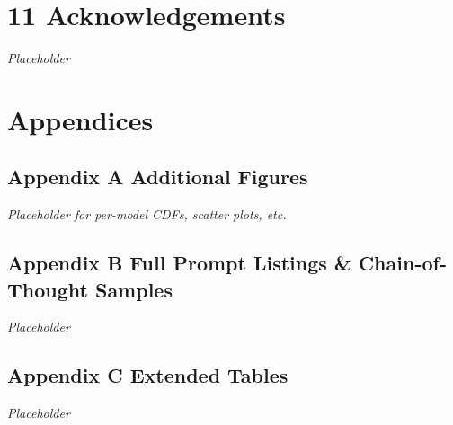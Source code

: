 \documentclass[
  11pt,
]{article}
\begin{document}
\section{11 Acknowledgements}\label{acknowledgements}

\emph{Placeholder}

\section{Appendices}\label{appendices}

\subsection{Appendix A Additional
Figures}\label{appendix-a-additional-figures}

\emph{Placeholder for per-model CDFs, scatter plots, etc.}

\subsection{Appendix B Full Prompt Listings \& Chain-of-Thought
Samples}\label{appendix-b-full-prompt-listings-chain-of-thought-samples}

\emph{Placeholder}

\subsection{Appendix C Extended
Tables}\label{appendix-c-extended-tables}

\emph{Placeholder}
\end{document}

